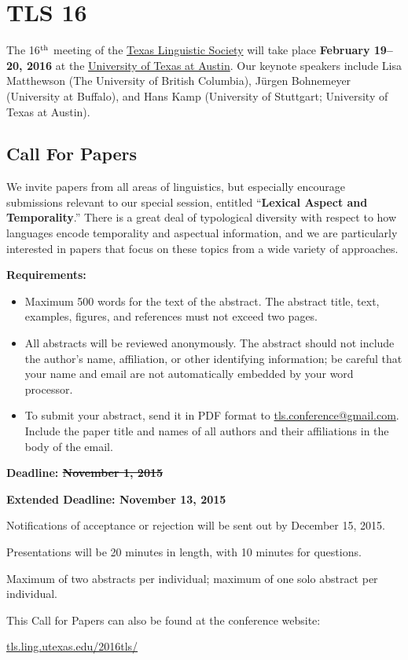 \documentclass[11pt]{article}
\begin{document}
\clearpage\thispagestyle{empty}

\section*{TLS 16}

The 16$^{\rm th}$ meeting of the \href{http://tls.ling.utexas.edu}{Texas Linguistic Society} will take place \textbf{February 19--20, 2016} at the \href{https://www.utexas.edu/cola/depts/linguistics/}{University of Texas at Austin}. Our keynote speakers include Lisa Matthewson (The University of British Columbia), J{\"u}rgen Bohnemeyer (University at Buffalo), and Hans Kamp (University of Stuttgart; University of Texas at Austin).

\subsection*{Call For Papers}

We invite papers from all areas of linguistics, but especially encourage submissions relevant to our special session, entitled ``\textbf{Lexical Aspect and Temporality}.'' There is a great deal of typological diversity with respect to how languages encode temporality and aspectual information, and we are particularly interested in papers that focus on these topics from a wide variety of approaches.

\bigskip\noindent
\textbf{Requirements:}

\begin{itemize}
  \setlength{\itemsep}{2pt}
  \setlength{\parskip}{2pt}
  \item Maximum 500 words for the text of the abstract. The abstract title, text, examples, figures, and references must not exceed two pages.
  \item All abstracts will be reviewed anonymously. The abstract should not include the author’s name, affiliation, or other identifying information; be careful that your name and email are not automatically embedded by your word processor.
  \item To submit your abstract, send it in PDF format to \href{mailto:tls.conference@gmail.com}{tls.conference@gmail.com}. Include the paper title and names of all authors and their affiliations in the body of the email.
\end{itemize}

\textbf{Deadline: \sout{November 1, 2015}}

\textbf{Extended Deadline: November 13, 2015}

\bigskip\noindent
Notifications of acceptance or rejection will be sent out by December 15, 2015.

\medskip\noindent
Presentations will be 20 minutes in length, with 10 minutes for questions.

\medskip\noindent
Maximum of two abstracts per individual; maximum of one solo abstract per individual.

\medskip\noindent
This Call for Papers can also be found at the conference website:

\medskip
\url{tls.ling.utexas.edu/2016tls/}
\end{document}
